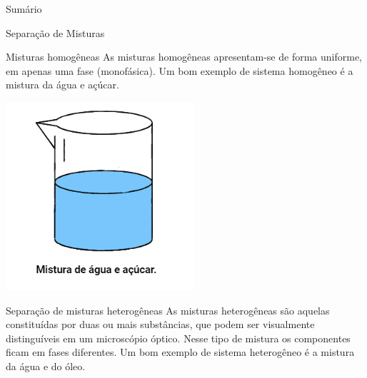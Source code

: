 \documentclass{beamer}
\author{fabio}
\date{\today}
\title{}
\begin{document}
\begin{frame}{Sumário}
\tableofcontents
\end{frame}

\begin{frame}[label={sec:orgd9c8d62}]{Separação de Misturas}
\begin{block}{Misturas homogêneas}
As misturas homogêneas apresentam-se de forma uniforme, em apenas uma fase (monofásica). Um bom exemplo de sistema homogêneo é a mistura da água e açúcar.

\begin{center}
\includegraphics[scale=0.5]{../img/homogenea.png}
\end{center}
\end{block}
\begin{block}{Separação de misturas heterogêneas}
As misturas heterogêneas são aquelas constituídas por duas ou mais substâncias, que podem ser visualmente distinguíveis em um microscópio óptico. Nesse tipo de mistura os componentes ficam em fases diferentes. Um bom exemplo de sistema heterogêneo é a mistura da água e do óleo.


\end{block}
\end{frame}
\end{document}
